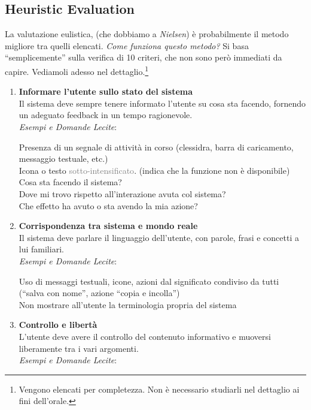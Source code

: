 \documentclass[oneside]{book}
\begin{document}
		\subsection{Heuristic Evaluation} \label{sec:heuristic}
			La valutazione eulistica, (che dobbiamo a \emph{Nielsen}) è probabilmente il metodo migliore tra quelli elencati. \emph{Come funziona questo metodo?} Si basa ``semplicemente'' sulla verifica di 10 criteri, che non sono però immediati da capire. Vediamoli adesso nel dettaglio.\footnote{ Vengono elencati per completezza. Non è necessario studiarli nel dettaglio ai fini dell'orale.}
			\begin{enumerate}

			\item \textbf{Informare l’utente sullo stato del sistema} \\
			Il sistema deve sempre tenere informato l’utente su cosa sta facendo, fornendo un adeguato feedback in un tempo ragionevole. \\
			\emph{Esempi e Domande Lecite}: 

			Presenza di un segnale di attività in corso (clessidra, barra di caricamento, messaggio testuale, etc.) \\
			Icona o testo \textcolor{gray}{sotto-intensificato}. (indica che la funzione non è disponibile) \\
			Cosa sta facendo il sistema? \\
			Dove mi trovo rispetto all’interazione avuta col sistema? \\
			Che effetto ha avuto o sta avendo la mia azione? \\

			\item \textbf{Corrispondenza tra sistema e mondo reale} \\
			Il sistema deve parlare il linguaggio dell’utente, con parole, frasi e concetti a lui familiari. \\
			\emph{Esempi e Domande Lecite}: 

			Uso di messaggi testuali, icone, azioni dal significato condiviso da tutti (``salva con nome'', azione ``copia e incolla'')\\
			Non mostrare all’utente la terminologia propria del sistema \\

			\item \textbf{Controllo e libertà} \\
			L’utente deve avere il controllo del contenuto informativo e muoversi liberamente tra i vari argomenti.\\
			\emph{Esempi e Domande Lecite}: 


\end{enumerate}
\end{document}
